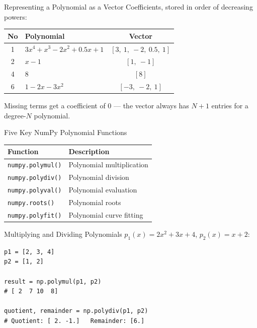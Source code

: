 \documentclass[9pt,aspectratio=169,xcolor=table]{beamer}
\begin{document}
\begin{frame}{Representing a Polynomial as a Vector}
    \leavevmode
    \small
    Coefficients, stored in order of \alert{decreasing powers}:

    \vspace{2mm}
    \begin{center}
    \begin{tabular}{@{}clc@{}}
        \toprule
        \textbf{No} & \textbf{Polynomial} & \textbf{Vector} \\
        \midrule
        1 & $3x^4 + x^3 - 2x^2 + 0.5x + 1$ & $[3,\ 1,\ -2,\ 0.5,\ 1]$ \\
        2 & $x - 1$ & $[1,\ -1]$ \\
        4 & $8$ & $[8]$ \\
        6 & $1 - 2x - 3x^2$ & $[-3,\ -2,\ 1]$ \\
        \bottomrule
    \end{tabular}
    \end{center}

    \vspace{2mm}
    {\scriptsize Missing terms get a coefficient of 0 --- the vector
    always has $N+1$ entries for a degree-$N$ polynomial.}
\end{frame}

\begin{frame}{Five Key NumPy Polynomial Functions}
    \leavevmode
    \begin{center}
    \begin{tabular}{@{}ll@{}}
        \toprule
        \textbf{Function} & \textbf{Description} \\
        \midrule
        \texttt{numpy.polymul()} & Polynomial multiplication \\
        \texttt{numpy.polydiv()} & Polynomial division \\
        \texttt{numpy.polyval()} & Polynomial evaluation \\
        \texttt{numpy.roots()}   & Polynomial roots \\
        \texttt{numpy.polyfit()} & Polynomial curve fitting \\
        \bottomrule
    \end{tabular}
    \end{center}
\end{frame}

\begin{frame}[fragile]{Multiplying and Dividing Polynomials}
    \leavevmode
    $p_1(x) = 2x^2 + 3x + 4$, \quad $p_2(x) = x + 2$:

\begin{lstlisting}
p1 = [2, 3, 4]
p2 = [1, 2]

result = np.polymul(p1, p2)
# [ 2  7 10  8]

quotient, remainder = np.polydiv(p1, p2)
# Quotient: [ 2. -1.]   Remainder: [6.]
\end{lstlisting}
\end{frame}
\end{document}
